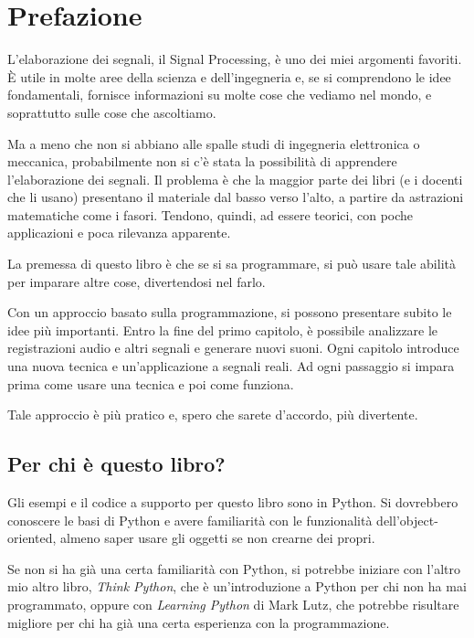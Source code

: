 \documentclass[12pt]{book} \usepackage[width=5.5in,height=8.5in, hmarginratio=3:2,vmarginratio=1:1]{geometry}
\begin{document}
\fi

\chapter{Prefazione} \label{preface} 

L'elaborazione dei segnali, il Signal Processing, è uno dei miei argomenti favoriti. È utile in molte aree della scienza e dell'ingegneria e, se si comprendono le idee fondamentali, fornisce informazioni su molte cose che vediamo nel mondo, e soprattutto sulle cose che ascoltiamo.

Ma a meno che non si abbiano alle spalle studi di ingegneria elettronica o meccanica, probabilmente non si c'è stata la possibilità di apprendere l'elaborazione dei segnali. Il problema è che la maggior parte dei libri (e i docenti che li usano) presentano il materiale dal basso verso l'alto, a partire da astrazioni matematiche come i fasori. Tendono, quindi, ad essere teorici, con poche applicazioni e poca rilevanza apparente.

La premessa di questo libro è che se si sa programmare, si può usare tale abilità per imparare altre cose, divertendosi nel farlo.

Con un approccio basato sulla programmazione, si possono presentare subito le idee più importanti. Entro la fine del primo capitolo, è possibile analizzare le registrazioni audio e altri segnali e generare nuovi suoni. Ogni capitolo introduce una nuova tecnica e un'applicazione a segnali reali. Ad ogni passaggio si impara prima come usare una tecnica e poi come funziona.

Tale approccio è più pratico e, spero che sarete d'accordo, più divertente.

\section{Per chi è questo libro?} 

Gli esempi e il codice a supporto per questo libro sono in Python. Si dovrebbero conoscere le basi di Python e avere familiarità con le funzionalità dell'object-oriented, almeno saper usare gli oggetti se non crearne dei propri.

Se non si ha già una certa familiarità con Python, si potrebbe iniziare con l'altro mio altro libro, {\it Think Python}, che è un'introduzione a Python per chi non ha mai programmato, oppure con {\it Learning Python} di Mark Lutz, che potrebbe risultare migliore per chi ha già una certa esperienza con la programmazione.
\end{document}
